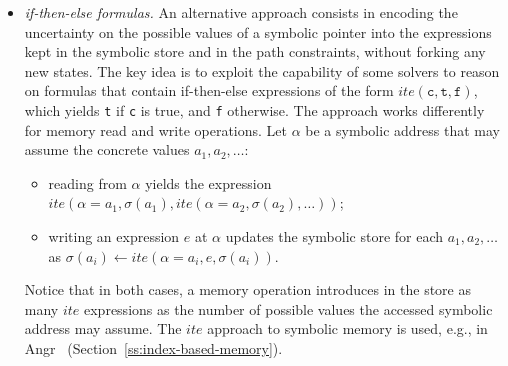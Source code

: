 \begin{itemize}
\item {\em if-then-else formulas.} An alternative approach consists in encoding the uncertainty on the possible values of a symbolic pointer into the expressions kept in the symbolic store and in the path constraints, without forking any new states. The key idea is to exploit the capability of some solvers to reason on formulas that contain if-then-else expressions of the form $ite(\texttt{c}, \texttt{t}, \texttt{f})$, which yields \texttt{t} if \texttt{c} is true, and \texttt{f} otherwise.
The approach works differently for memory read and write operations. Let $\alpha$ be a symbolic address that may assume the concrete values $a_1, a_2, \ldots$:
\begin{itemize}
\item reading from $\alpha$ yields the expression $ite(\alpha=a_1,\sigma(a_1), ite(\alpha=a_2,\sigma(a_2), \ldots))$;
\item writing an expression $e$ at $\alpha$ updates the symbolic store for each $a_1, a_2, \ldots$ as $\sigma(a_i)\gets ite(\alpha=a_i,e,\sigma(a_i))$.
\end{itemize}
Notice that in both cases, a memory operation introduces in the store as many $ite$ expressions as the number of possible values the accessed symbolic address may assume. The $ite$ approach to symbolic memory is used, e.g., in {\sc Angr}~\cite{ANGR-SSP16} (Section~\ref{ss:index-based-memory}).


\end{itemize}
